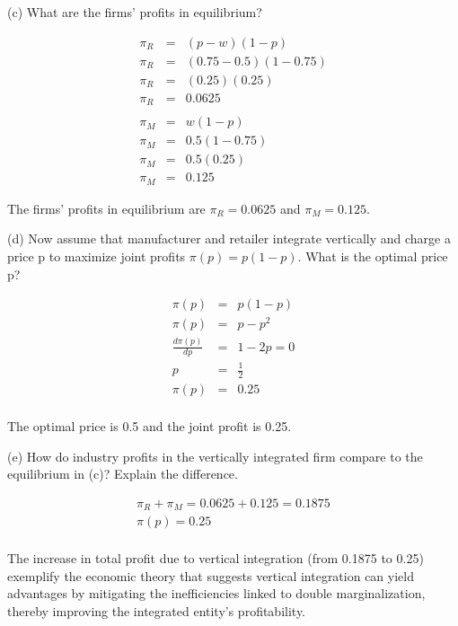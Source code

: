\begin{tcolorbox}
    (c) What are the firms' profits in equilibrium?
\end{tcolorbox}

\begin{eqnarray*}
\pi_R &=& (p - w)(1 - p)\\
\pi_R &=& (0.75 - 0.5)(1 - 0.75)\\
\pi_R &=& (0.25)(0.25)\\
\pi_R &=& 0.0625\\
\\
\pi_M &=& w(1 - p)\\
\pi_M &=& 0.5(1 - 0.75)\\
\pi_M &=& 0.5(0.25)\\
\pi_M &=& 0.125
\end{eqnarray*}

\begin{myanswerbox}
    The firms' profits in equilibrium are $\pi_R = 0.0625$ and $\pi_M = 0.125$.
\end{myanswerbox}

\begin{tcolorbox}
    (d) Now assume that manufacturer and retailer integrate vertically and charge a price p to maximize joint profits $\pi(p) = p(1 - p)$. What is the optimal price p?
\end{tcolorbox}

\begin{eqnarray*}
\pi(p) &=& p(1 - p)\\
\pi(p) &=& p - p^2\\
\frac{d\pi(p)}{dp} &=& 1 - 2p=0\\
p &=& \frac{1}{2}\\
\pi(p) &=& 0.25\\
\end{eqnarray*}

\begin{myanswerbox}
    The optimal price is 0.5 and the joint profit is 0.25.
\end{myanswerbox}

\begin{tcolorbox}
    (e) How do industry profits in the vertically integrated firm compare to the equilibrium in (c)? Explain the difference.
\end{tcolorbox}

\begin{eqnarray*}
\pi_R + \pi_M= 0.0625 + 0.125= 0.1875\\
\pi(p) = 0.25\\
\end{eqnarray*}

\begin{myanswerbox}
    The increase in total profit due to vertical integration (from  0.1875 to 0.25) exemplify the economic theory that suggests vertical integration can yield advantages by mitigating the inefficiencies linked to double marginalization, thereby improving the integrated entity's profitability.
\end{myanswerbox}